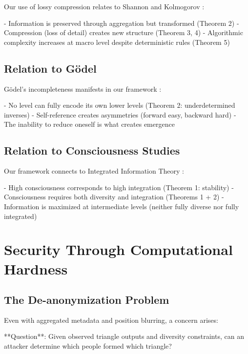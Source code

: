 \documentclass[12pt,a4paper]{article}
\theoremstyle{definition}
\begin{document}
{Our use of lossy compression relates to Shannon and Kolmogorov \citep{shannon1948mathematical, kolmogorov1965three}:

- Information is preserved through aggregation but transformed (Theorem 2)
- Compression (loss of detail) creates new structure (Theorem 3, 4)
- Algorithmic complexity increases at macro level despite deterministic rules (Theorem 5)

\subsection{Relation to Gödel}

Gödel's incompleteness manifests in our framework \citep{godel1931}:

- No level can fully encode its own lower levels (Theorem 2: underdetermined inverses)
- Self-reference creates asymmetries (forward easy, backward hard)
- The inability to reduce oneself is what creates emergence

\subsection{Relation to Consciousness Studies}

Our framework connects to Integrated Information Theory \citep{tononi2012integrated}:

- High consciousness corresponds to high integration (Theorem 1: stability)
- Consciousness requires both diversity and integration (Theorems 1 + 2)
- Information is maximized at intermediate levels (neither fully diverse nor fully integrated)

\section{Security Through Computational Hardness}

\subsection{The De-anonymization Problem}

Even with aggregated metadata and position blurring, a concern arises:

**Question**: Given observed triangle outputs and diversity constraints, can an attacker determine which people formed which triangle?

}
\end{document}
